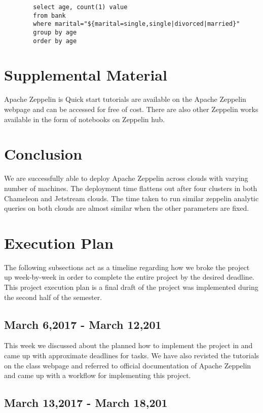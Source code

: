 \documentclass[9pt,twocolumn,twoside]{../../styles/osajnl}
\begin{document}
	\begin{verbatim}
		select age, count(1) value 
		from bank 
		where marital="${marital=single,single|divorced|married}" 
		group by age 
		order by age
	\end{verbatim}
	
	\section{Supplemental Material}
	
	Apache Zeppelin is Quick start tutorials are available on the 
	Apache Zeppelin webpage\cite{www-tutorial1} and can be accessed 
	for free of cost. There are also other Zeppelin works available 
	in the form of notebooks on Zeppelin hub\cite{www-zhub}.
	
	\section{Conclusion}
	
	We are successfully able to deploy Apache Zeppelin across clouds 
	with varying number of machines. The deployment time flattens out 
	after four clusters in both Chameleon and Jetstream clouds. The 
	time 
	taken to run similar zeppelin  analytic queries on both clouds 
	are 
	almost 
	similar 
	when the other parameters are fixed. 
	
	\section{Execution Plan}
	
	The following subsections act as a timeline regarding how we 
	broke 
	the project up week-by-week in order to complete the entire 
	project 
	by the desired deadline. This project execution plan is a final 
	draft 
	of the project was implemented during the second half of the 
	semester.
	
	\subsection{March 6,2017 - March 12,201}
	
	This week we discussed about the planned how to implement the 
	project 
	in and came up with approximate deadlines for tasks. We have also 
	revisted the tutorials on the class webpage and referred to 
	official 
	documentation of Apache Zeppelin and came up with a workflow for 
	implementing this project.
	
	\subsection{March 13,2017 - March 18,201}
	
\end{document}

